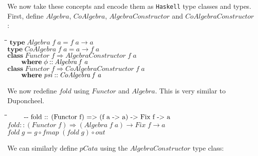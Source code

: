 \documentclass[10pt]{article}
\newlength{\lwidth}\setlength{\lwidth}{4.5cm}
\newlength{\cwidth}\setlength{\cwidth}{8mm} %
\newcommand{\Conid}[1]{\mathit{#1}}
\newcommand{\Varid}[1]{\mathit{#1}}
\begin{document}
We now take these concepts and encode them as \texttt{Haskell} type
classes and types.  First, define \ensuremath{\Conid{Algebra}}, \ensuremath{\Conid{CoAlgebra}},
\ensuremath{\Conid{AlgebraConstructor}} and \ensuremath{\Conid{CoAlgebraConstructor}}:

\begin{tabbing}
\qquad\=\hspace{\lwidth}\=\hspace{\cwidth}\=\+\kill
${\mathbf{type}\;\Conid{Algebra}\;\Varid{f}\;\Varid{a}\mathrel{=}\Varid{f}\;\Varid{a}\to \Varid{a}}$\\
${\mathbf{type}\;\Conid{CoAlgebra}\;\Varid{f}\;\Varid{a}\mathrel{=}\Varid{a}\to \Varid{f}\;\Varid{a}}$\\
${}$\\
${\mathbf{class}\;\Conid{Functor}\;\Varid{f}\Rightarrow \Conid{AlgebraConstructor}\;\Varid{f}\;\Varid{a}}$\\
${\hskip2.00em\relax\mathbf{where}\;\Varid{\phi}\mathbin{::}\Conid{Algebra}\;\Varid{f}\;\Varid{a}}$\\
${}$\\
${\mathbf{class}\;\Conid{Functor}\;\Varid{f}\Rightarrow \Conid{CoAlgebraConstructor}\;\Varid{f}\;\Varid{a}}$\\
${\hskip2.00em\relax\mathbf{where}\;\Varid{psi}\mathbin{::}\Conid{CoAlgebra}\;\Varid{f}\;\Varid{a}}$
\end{tabbing}
We now redefine \ensuremath{\Varid{fold}} using \ensuremath{\Conid{Functor}} and \ensuremath{\Conid{Algebra}}.  This is very
similar to Duponcheel.

\begin{tabbing}
\qquad\=\hspace{\lwidth}\=\hspace{\cwidth}\=\+\kill
${\mbox{\qquad-{}-  fold :: (Functor f) => (f a -> a) -> Fix f -> a}}$\\
${\Varid{fold}\mathbin{::}(\Conid{Functor}\;\Varid{f})\Rightarrow (\Conid{Algebra}\;\Varid{f}\;\Varid{a})\to \Conid{Fix}\;\Varid{f}\to \Varid{a}}$\\
${\Varid{fold}\;\Varid{g}\mathrel{=}\Varid{g}\mathbin{\circ}\Varid{fmap}\;(\Varid{fold}\;\Varid{g})\mathbin{\circ}\Varid{out}}$
\end{tabbing}
We can similarly define \ensuremath{\Varid{pCata}} using the \ensuremath{\Conid{AlgebraConstructor}} type class:
\end{document}
